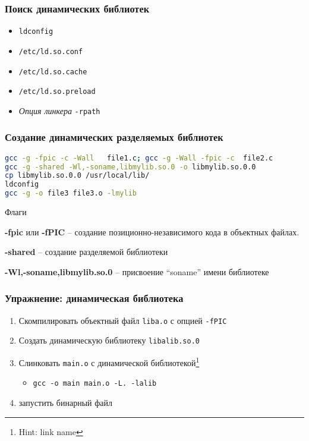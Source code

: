 \begin{frame}[fragile]
  \frametitle{Поиск динамических библиотек}
  \begin{itemize}
	\item {\tt ldconfig}
	\item {\tt /etc/ld.so.conf}
	\item {\tt /etc/ld.so.cache}
	\item {\tt /etc/ld.so.preload}
	\item {\it Опция линкера} {\tt -rpath}
  \end{itemize}
\end{frame}


\begin{frame}[fragile]
  \frametitle{Создание динамических разделяемых библиотек}
\begin{lstlisting}[language=sh]
gcc -g -fpic -c -Wall   file1.c; gcc -g -Wall -fpic -c  file2.c
gcc -g -shared -Wl,-soname,libmylib.so.0 -o libmylib.so.0.0 
cp libmylib.so.0.0 /usr/local/lib/
ldconfig 
gcc -g -o file3 file3.o -lmylib
\end{lstlisting}

	\begin{block}{Флаги}
	
		{\bf -fpic} или {\bf -fPIC} -- создание позиционно-независимого кода в объектных файлах.

		{\bf -shared} -- создание разделяемой библиотеки

		{\bf -Wl,-soname,libmylib.so.0} -- присвоение ``soname'' имени библиотеке

	\end{block}

\end{frame}

\begin{frame}
	\frametitle{Упражнение: динамическая библиотека}

	\begin{enumerate}
		\item Скомпилировать объектный файл {\tt liba.o} с опцией {\tt -fPIC}
		\item Создать динамическую библиотеку {\tt libalib.so.0} 
		\item Слинковать {\tt main.o} с динамической библиотекой\footnote{Hint: link name}
			\begin{itemize}
				\item {\tt gcc -o main main.o -L. -lalib }
			\end{itemize}
		\item запустить бинарный файл

	\end{enumerate}
\end{frame}



